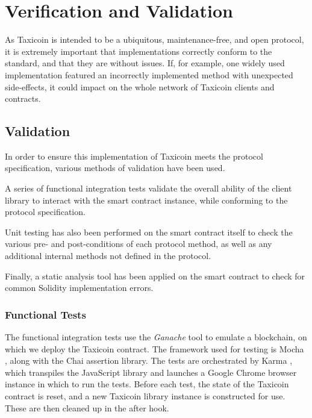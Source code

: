\section{Verification and Validation}

As Taxicoin is intended to be a ubiquitous, maintenance-free, and open protocol, it is extremely important that implementations correctly conform to the standard, and that they are without issues. If, for example, one widely used implementation featured an incorrectly implemented method with unexpected side-effects, it could impact on the whole network of Taxicoin clients and contracts.

\subsection{Validation}


In order to ensure this implementation of Taxicoin meets the protocol specification, various methods of validation have been used.

A series of functional integration tests validate the overall ability of the client library to interact with the smart contract instance, while conforming to the protocol specification.

Unit testing has also been performed on the smart contract itself to check the various pre- and post-conditions of each protocol method, as well as any additional internal methods not defined in the protocol.

Finally, a static analysis tool has been applied on the smart contract to check for common Solidity implementation errors.

\subsubsection{Functional Tests}


The functional integration tests use the \textit{Ganache} \cite{Ganache} tool to emulate a blockchain, on which we deploy the Taxicoin contract. The framework used for testing is Mocha \cite{Mocha}, along with the Chai \cite{Chai} assertion library. The tests are orchestrated by Karma \cite{Karma}, which transpiles the JavaScript library and launches a Google Chrome browser instance in which to run the tests. Before each test, the state of the Taxicoin contract is reset, and a new Taxicoin library instance is constructed for use. These are then cleaned up in the after hook.

